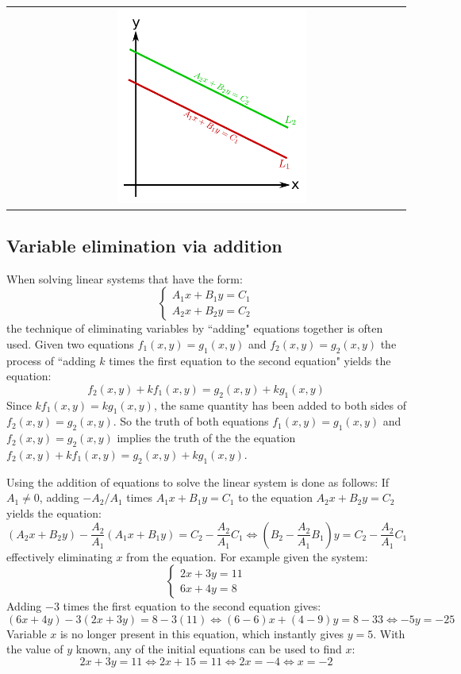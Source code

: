 \documentclass{article}
\begin{document}
\begin{tabular}{cc}
{} & \parbox{0.5\textwidth}{
\includegraphics[width = 0.5\textwidth]{line_intersection_scenarios_0_points}
}
\end{tabular}



\subsection*{Variable elimination via addition}

When solving linear systems that have the form:
\[\left\{\begin{array}{c}
A_1x + B_1y = C_1 \\
A_2x + B_2y = C_2
\end{array}\right.\]
the technique of eliminating variables by ``adding" equations together is often used. Given two equations \(f_1(x,y) = g_1(x,y)\) and \(f_2(x,y) = g_2(x,y)\) the process of ``adding \(k\) times the first equation to the second equation" yields the equation:
\[f_2(x,y) + kf_1(x,y) = g_2(x,y) + kg_1(x,y)\]
Since \(kf_1(x,y) = kg_1(x,y)\), the same quantity has been added to both sides of \(f_2(x,y) = g_2(x,y)\). So the truth of both equations \(f_1(x,y) = g_1(x,y)\) and \(f_2(x,y) = g_2(x,y)\) implies the truth of the the equation \(f_2(x,y) + kf_1(x,y) = g_2(x,y) + kg_1(x,y)\).

Using the addition of equations to solve the linear system is done as follows: If \(A_1 \neq 0\), adding \(-A_2/A_1\) times \(A_1x + B_1y = C_1\) to the equation \(A_2x + B_2y = C_2\) yields the equation:
\[(A_2x + B_2y) - \frac{A_2}{A_1}(A_1x + B_1y) = C_2 - \frac{A_2}{A_1}C_1 \iff (B_2 - \frac{A_2}{A_1}B_1)y = C_2 - \frac{A_2}{A_1}C_1\]
effectively eliminating \(x\) from the equation. For example given the system:
\[\left\{\begin{array}{c}
2x + 3y = 11 \\
6x + 4y = 8 
\end{array}\right.\]
Adding \(-3\) times the first equation to the second equation gives:
\[(6x + 4y) - 3(2x + 3y) = 8 - 3(11) \iff (6 - 6)x + (4 - 9)y = 8 - 33 \iff -5y = -25\]
Variable \(x\) is no longer present in this equation, which instantly gives \(y = 5\). With the value of \(y\) known, any of the initial equations can be used to find \(x\):
\[2x + 3y = 11 \iff 2x + 15 = 11 \iff 2x = -4 \iff x = -2\]
\end{document}
